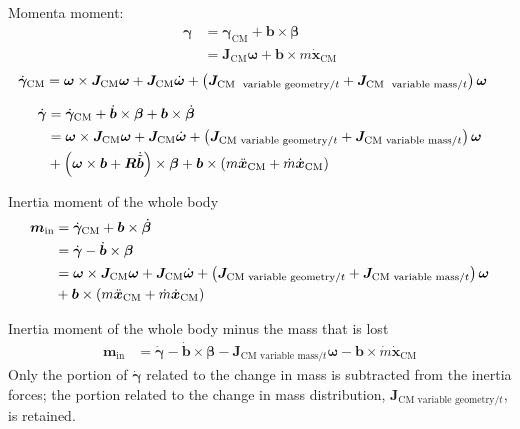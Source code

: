 \documentclass[10pt,dvips,fleqn,subeqn]{report}
\newcommand{\T}[1]{\bm{#1}}
\newcommand{\TT}[1]{\bm{#1}}
\begin{document}
Momenta moment:
\begin{align}
	\T{\gamma}
	&=
	\T{\gamma}_\text{CM}
	+
	\T{b} \times \T{\beta}
	\nonumber \\
	&=
	\TT{J}_\text{CM} \T{\omega}
	+
	\T{b} \times m \dot{\T{x}}_\text{CM}
\end{align}
\begin{align}
	\dot{\T{\gamma}}_\text{CM}
	&=
	\T{\omega} \times \TT{J}_\text{CM} \T{\omega}
	+
	\TT{J}_\text{CM} \dot{\T{\omega}}
	+
	\plbr{
		\TT{J}_{\text{CM \ variable geometry}/t}
		+
		\TT{J}_{\text{CM \ variable mass}/t}
	} \T{\omega}
\end{align}

\begin{align}
	\dot{\T{\gamma}}
	&=
	\dot{\T{\gamma}}_\text{CM}
	+
	\dot{\T{b}} \times \T{\beta}
	+
	\T{b} \times \dot{\T{\beta}}
	\nonumber \\
	&=
	\T{\omega} \times \TT{J}_\text{CM} \T{\omega}
	+
	\TT{J}_\text{CM} \dot{\T{\omega}}
	+
	\plbr{
		\TT{J}_{\text{CM variable geometry}/t}
		+
		\TT{J}_{\text{CM variable mass}/t}
	} \T{\omega}
	\nonumber \\
	&\mbox{}
	+ \plbr{
		\T{\omega} \times \T{b}
		+
		\TT{R} \dot{\tilde{\T{b}}}
	} \times \T{\beta}
	+
	\T{b} \times \plbr{
		m \ddot{\T{x}}_\text{CM}
		+
		\dot{m} \dot{\T{x}}_\text{CM}
	}
\end{align}

Inertia moment of the whole body
\begin{align}
	\T{m}_\text{in}
	&=
	\dot{\T{\gamma}}_\text{CM}
	+
	\T{b} \times \dot{\T{\beta}}
	\nonumber \\
	&=
	\dot{\T{\gamma}}
	-
	\dot{\T{b}} \times \T{\beta}
	\nonumber \\
	&=
	\T{\omega} \times \TT{J}_\text{CM} \T{\omega}
	+
	\TT{J}_\text{CM} \dot{\T{\omega}}
	+
	\plbr{
		\TT{J}_{\text{CM variable geometry}/t}
		+
		\TT{J}_{\text{CM variable mass}/t}
	} \T{\omega}
	\nonumber \\
	&\mbox{}
	+
	\T{b} \times \plbr{
		m \ddot{\T{x}}_\text{CM}
		+
		\dot{m} \dot{\T{x}}_\text{CM}
	}
\end{align}

Inertia moment of the whole body minus the mass that is lost
\begin{align}
	\T{m}_\text{in}
	&=
	\dot{\T{\gamma}}
	-
	\dot{\T{b}} \times \T{\beta}
	-
	\TT{J}_{\text{CM variable mass}/t} \T{\omega}
	-
	\T{b} \times \dot{m} \dot{\T{x}}_\text{CM}
\end{align}
Only the portion of $\dot{\T{\gamma}}$ related to the change in mass
is subtracted from the inertia forces; the portion related
to the change in mass distribution,
$\TT{J}_{\text{CM variable geometry}/t}$,
is retained.
\end{document}
